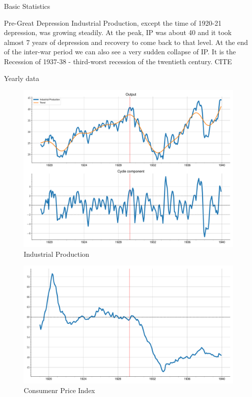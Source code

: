 \documentclass[a4paper,12pt]{article}
\begin{document}
\begin{table}
\label{table:1}
\caption{Basic Statistics}
\centering

\end{table}

Pre-Great Depression Industrial Production, except the time of 1920-21 depression, was growing steadily. At the peak, IP was about 40 and it took almost 7 years of depression and recovery to come back to that level. At the end of the inter-war period we can also see a very sudden collapse of IP. It is the Recession of 1937-38 - third-worst recession of the twentieth century. CITE

\begin{table}
\label{table:2}
\caption{Yearly data}
\begin{adjustbox}{max width=1.1\textwidth,center}
\centering

\end{adjustbox}
\end{table}



\begin{figure}[H]
    \centering
\caption{Industrial Production}
    \includegraphics[width=\textwidth]{../output/figures/ts_IP.pdf} 
\end{figure}
\newpage

\begin{figure}[H]
    \centering
\caption{Consumenr Price Index}
    \includegraphics[width=\textwidth]{../output/figures/ts_CPI.pdf} 
\end{figure}
\end{document}
